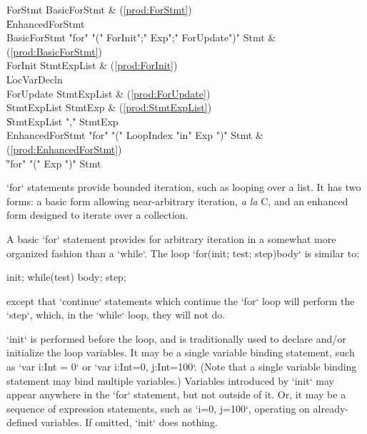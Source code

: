 \begin{bbgrammar}
             ForStmt \: BasicForStmt & (\ref{prod:ForStmt}) \\
                     \| EnhancedForStmt \\
        BasicForStmt \: \xcd"for" \xcd"(" ForInit\opt \xcd";" Exp\opt \xcd";" ForUpdate\opt \xcd")" Stmt & (\ref{prod:BasicForStmt}) \\
             ForInit \: StmtExpList & (\ref{prod:ForInit}) \\
                     \| LocVarDecln \\
           ForUpdate \: StmtExpList & (\ref{prod:ForUpdate}) \\
         StmtExpList \: StmtExp & (\ref{prod:StmtExpList}) \\
                     \| StmtExpList \xcd"," StmtExp \\
     EnhancedForStmt \: \xcd"for" \xcd"(" LoopIndex \xcd"in" Exp \xcd")" Stmt & (\ref{prod:EnhancedForStmt}) \\
                     \| \xcd"for" \xcd"(" Exp \xcd")" Stmt \\
\end{bbgrammar}

\xcd`for` statements provide bounded iteration, such as looping over a list.
It has two forms: a basic form allowing near-arbitrary iteration, {\em a la}
C, and an enhanced form designed to iterate over a collection.

A basic \xcd`for` statement provides for arbitrary iteration in a somewhat
more organized fashion than a \xcd`while`.  The loop 
\xcd`for(init; test; step)body` is
similar to: 
\begin{xten}
{
   init;
   while(test) {
      body;
      step;
   }
}
\end{xten}
\noindent
except that \xcd`continue` statements which continue the \xcd`for` loop will
perform the \xcd`step`, which, in the \xcd`while` loop, they will not do. 

\xcd`init` is performed before the loop, and is traditionally used to declare
and/or initialize the loop variables. It may be a single variable binding
statement, such as \xcd`var i:Int = 0` or \xcd`var i:Int=0, j:Int=100`. (Note
that a single variable binding statement may bind multiple variables.)
Variables introduced by \xcd`init` may appear anywhere in the \xcd`for`
statement, but not outside of it.  Or, it may be a sequence of expression
statements, such as \xcd`i=0, j=100`, operating on already-defined variables.
If omitted, \xcd`init` does nothing.

